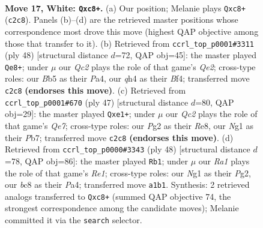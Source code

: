 \documentclass[11pt]{article}
\begin{document}
\clearpage

\begin{figure}[p]\centering
\begin{subfigure}{0.46\textwidth}\centering
\resizebox{\linewidth}{!}{%
\newchessgame
\chessboard[
  setfen={rnb2k1r/5p2/8/pB1p3p/3Pp2q/8/PPQ2PP1/R3K1N1 w Q - 0 17},
  showmover=false,
  pgfstyle=straightmove, color=movearrow, markmove={c2-c8}
]}
\caption{}
\end{subfigure}\hfill
\begin{subfigure}{0.46\textwidth}\centering
\resizebox{\linewidth}{!}{%
\newchessgame
\chessboard[
  setfen={rn4k1/1p3p2/p2p2p1/3P4/P2p1BPp/7q/4Q2P/4K2R w K - 0 25},
  showmover=false,
  pgfstyle=straightmove, color=movearrow, markmove={e2-e8}
]}
\caption{}
\end{subfigure}
\\[4pt]
\begin{subfigure}{0.46\textwidth}\centering
\resizebox{\linewidth}{!}{%
\newchessgame
\chessboard[
  setfen={4r3/ppp2ppk/7p/5b2/2P2P1Q/1P6/P3qP1P/R3R1K1 b - - 4 24},
  showmover=false,
  pgfstyle=straightmove, color=movearrow, markmove={e2-e1}
]}
\caption{}
\end{subfigure}\hfill
\begin{subfigure}{0.46\textwidth}\centering
\resizebox{\linewidth}{!}{%
\newchessgame
\chessboard[
  setfen={6k1/1p1r4/2q3np/p2p2pN/P2P4/1QP5/6PP/4R1K1 w - - 2 25},
  showmover=false,
  pgfstyle=straightmove, color=movearrow, markmove={e1-b1}
]}
\caption{}
\end{subfigure}
\caption{\textbf{Move 17, White: \texttt{Qxc8+}.} (a) Our position; Melanie plays \texttt{Qxc8+} (\texttt{c2c8}). Panels (b)--(d) are the retrieved master positions whose correspondence most drove this move (highest QAP objective among those that transfer to it). (b) Retrieved from \texttt{ccrl\_top\_p0001\#3311} (ply 48) [structural distance $d$=72, QAP obj=45]: the master played \texttt{Qe8+}; under $\mu$ our \emph{Qc2} plays the role of that game's \emph{Qe2}; cross-type roles: our \emph{B}b5 as their \emph{P}a4, our \emph{q}h4 as their \emph{B}f4; transferred move \texttt{c2c8} \textbf{(endorses this move)}. (c) Retrieved from \texttt{ccrl\_top\_p0001\#670} (ply 47) [structural distance $d$=80, QAP obj=29]: the master played \texttt{Qxe1+}; under $\mu$ our \emph{Qc2} plays the role of that game's \emph{Qe7}; cross-type roles: our \emph{P}g2 as their \emph{R}e8, our \emph{N}g1 as their \emph{P}b7; transferred move \texttt{c2c8} \textbf{(endorses this move)}. (d) Retrieved from \texttt{ccrl\_top\_p0000\#3343} (ply 48) [structural distance $d$=78, QAP obj=86]: the master played \texttt{Rb1}; under $\mu$ our \emph{Ra1} plays the role of that game's \emph{Re1}; cross-type roles: our \emph{N}g1 as their \emph{P}g2, our \emph{b}c8 as their \emph{P}a4; transferred move \texttt{a1b1}. Synthesis: 2 retrieved analogs transferred to \texttt{Qxc8+} (summed QAP objective 74, the strongest correspondence among the candidate moves); Melanie committed it via the \texttt{search} selector.}
\label{fig:thought-m32}
\end{figure}
\end{document}
